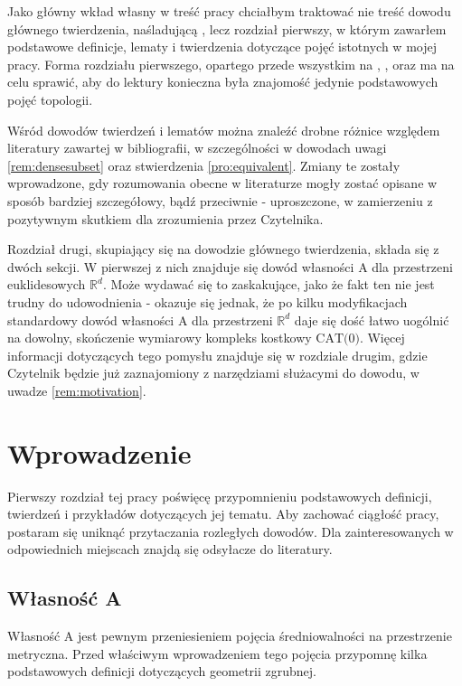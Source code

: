 \documentclass[licencjacka]{pracamgr}
\theoremstyle{definition}
\theoremstyle{definition}
\theoremstyle{definition}
\theoremstyle{definition}
\theoremstyle{definition}
\theoremstyle{plain}
\theoremstyle{plain}
\begin{document}
Jako główny wkład własny w treść pracy chciałbym traktować nie treść dowodu głównego 
twierdzenia, naśladującą \cite{brodzki}, lecz rozdział pierwszy, w którym zawarłem 
podstawowe definicje, lematy i twierdzenia dotyczące pojęć istotnych w mojej pracy. Forma 
rozdziału pierwszego, opartego przede wszystkim na \cite{schwer}, \cite{caprace}, 
\cite{willett} oraz \cite{nowak} ma na celu sprawić, aby do lektury konieczna była 
znajomość jedynie podstawowych pojęć topologii.

Wśród dowodów twierdzeń i lematów można znaleźć drobne różnice względem literatury 
zawartej w bibliografii, w szczególności w dowodach uwagi \ref{rem:densesubset} oraz 
stwierdzenia \ref{pro:equivalent}. Zmiany te zostały wprowadzone, gdy rozumowania 
obecne w literaturze mogły zostać opisane w sposób bardziej szczegółowy, bądź przeciwnie - 
uproszczone, w zamierzeniu z pozytywnym skutkiem dla zrozumienia przez Czytelnika.

Rozdział drugi, skupiający się na dowodzie głównego twierdzenia, składa się z dwóch sekcji. 
W pierwszej z nich znajduje się dowód własności A dla przestrzeni euklidesowych 
$ \mathbb{R}^d $. Może wydawać się to zaskakujące, jako że fakt ten nie jest trudny do
udowodnienia - okazuje się jednak, że po kilku modyfikacjach standardowy dowód 
własności A dla przestrzeni $ \mathbb{R}^d $ daje się dość łatwo uogólnić na dowolny, 
skończenie wymiarowy kompleks kostkowy $ \text{CAT(0)}$. Więcej informacji dotyczących 
tego pomysłu znajduje się w rozdziale drugim, gdzie Czytelnik będzie już zaznajomiony 
z narzędziami służacymi do dowodu, w uwadze \ref{rem:motivation}.
\chapter{Wprowadzenie}

Pierwszy rozdział tej pracy poświęcę przypomnieniu podstawowych definicji, 
twierdzeń i przykładów dotyczących jej tematu. Aby zachować ciągłość pracy, 
postaram się uniknąć przytaczania rozległych dowodów. Dla zainteresowanych 
w odpowiednich miejscach znajdą się odsyłacze do literatury.

\section{Własność A}

Własność A jest pewnym przeniesieniem pojęcia średniowalności na przestrzenie metryczna. 
Przed właściwym wprowadzeniem tego pojęcia przypomnę kilka podstawowych 
definicji dotyczących geometrii zgrubnej.
\end{document}
